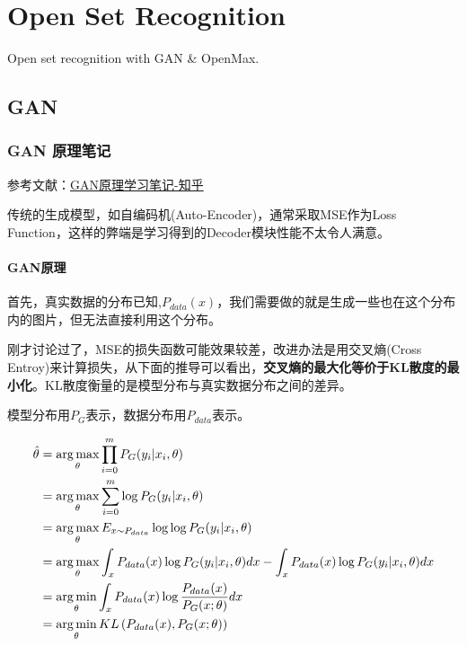 \chapter{Open Set Recognition}

Open set recognition with GAN \& OpenMax.

\section{GAN}

\subsection{GAN 原理笔记}

参考文献：\href{https://zhuanlan.zhihu.com/p/27295635}{GAN原理学习笔记-知乎}

传统的生成模型，如自编码机(Auto-Encoder)，通常采取MSE作为Loss Function，这样的弊端是学习得到的Decoder模块性能不太令人满意。

\subsubsection{GAN原理}

首先，真实数据的分布已知,$P_{data}(x)$，我们需要做的就是生成一些也在这个分布内的图片，但无法直接利用这个分布。

刚才讨论过了，MSE的损失函数可能效果较差，改进办法是用交叉熵(Cross Entroy)来计算损失，从下面的推导可以看出，\textbf{交叉熵的最大化等价于KL散度的最小化}。KL散度衡量的是模型分布与真实数据分布之间的差异。

模型分布用$P_G$表示，数据分布用$P_{data}$表示。

\begin{align}
\hat{\theta} & = \operatorname*{arg\,max}_{\theta} \prod_{i=0}^{m}P_G(y_i | x_i, \theta) \\
             & = \operatorname*{arg\,max}_{\theta} \sum_{i=0}^{m} \log P_G(y_i | x_i, \theta) \notag \\
             & = \operatorname*{arg\,max}_{\theta} E_{x \sim P_{data}} \log \log P_G(y_i | x_i, \theta)  \notag \\
             & = \operatorname*{arg\,max}_{\theta} \int_{x} P_{data}(x) \log P_G(y_i | x_i, \theta)dx   - \int_{x} P_{data}(x) \log P_G(y_i | x_i, \theta) dx \\
             & = \operatorname*{arg\,min}_{\theta} \int_{x}P_{data}(x) \log \frac{P_{data}(x)}{P_G(x; \theta)} dx \\
             & = \operatorname*{arg\,min}_{\theta} KL\left( P_{data}(x), P_G(x; \theta)  \right)
\end{align}

